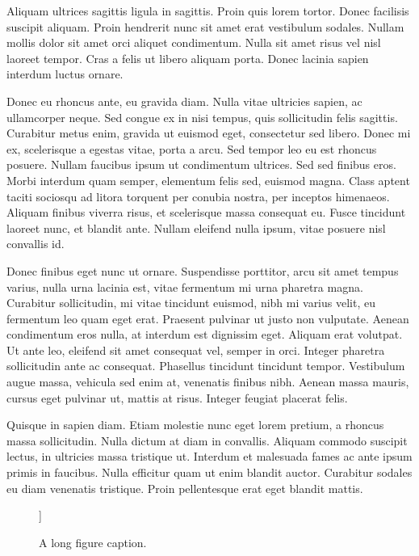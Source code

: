 Aliquam ultrices sagittis ligula in sagittis. Proin quis lorem tortor. Donec
facilisis suscipit aliquam. Proin hendrerit nunc sit amet erat vestibulum
sodales. Nullam mollis dolor sit amet orci aliquet condimentum. Nulla sit amet
risus vel nisl laoreet tempor. Cras a felis ut libero aliquam porta. Donec
lacinia sapien interdum luctus ornare.

Donec eu rhoncus ante, eu gravida diam. Nulla vitae ultricies sapien, ac
ullamcorper neque. Sed congue ex in nisi tempus, quis sollicitudin felis
sagittis. Curabitur metus enim, gravida ut euismod eget, consectetur sed
libero. Donec mi ex, scelerisque a egestas vitae, porta a arcu. Sed tempor leo
eu est rhoncus posuere. Nullam faucibus ipsum ut condimentum ultrices. Sed sed
finibus eros. Morbi interdum quam semper, elementum felis sed, euismod
magna. Class aptent taciti sociosqu ad litora torquent per conubia nostra, per
inceptos himenaeos. Aliquam finibus viverra risus, et scelerisque massa
consequat eu. Fusce tincidunt laoreet nunc, et blandit ante. Nullam eleifend
nulla ipsum, vitae posuere nisl convallis id.

Donec finibus eget nunc ut ornare. Suspendisse porttitor, arcu sit amet tempus
varius, nulla urna lacinia est, vitae fermentum mi urna pharetra
magna. Curabitur sollicitudin, mi vitae tincidunt euismod, nibh mi varius velit,
eu fermentum leo quam eget erat. Praesent pulvinar ut justo non
vulputate. Aenean condimentum eros nulla, at interdum est dignissim
eget. Aliquam erat volutpat. Ut ante leo, eleifend sit amet consequat vel,
semper in orci. Integer pharetra sollicitudin ante ac consequat. Phasellus
tincidunt tincidunt tempor. Vestibulum augue massa, vehicula sed enim at,
venenatis finibus nibh. Aenean massa mauris, cursus eget pulvinar ut, mattis at
risus. Integer feugiat placerat felis.

Quisque in sapien diam. Etiam molestie nunc eget lorem pretium, a rhoncus massa
sollicitudin. Nulla dictum at diam in convallis. Aliquam commodo suscipit
lectus, in ultricies massa tristique ut. Interdum et malesuada fames ac ante
ipsum primis in faucibus. Nulla efficitur quam ut enim blandit auctor. Curabitur
sodales eu diam venenatis tristique. Proin pellentesque erat eget blandit
mattis.

\begin{figure}[h]
  \centering
  [[ A FIGURE GOES HERE ]]
  \caption[Short figure caption for list of figures]{A long figure caption.}
  \label{fig:ordpart}
\end{figure}

